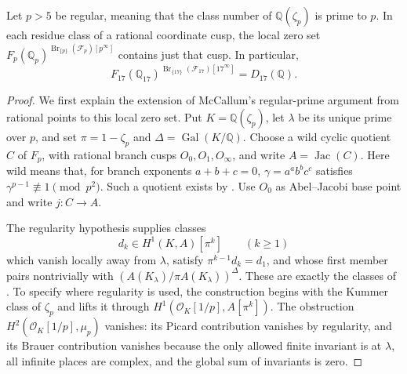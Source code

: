 \begin{proposition}
\label{prop:regular-primary-brauer-cusp-discs}
Let $p>5$ be regular, meaning that the class number of
$\mathbb Q(\zeta_p)$ is prime to $p$.  In each residue class of a
rational coordinate cusp, the local zero set
$F_p(\mathbb Q_p)^{\operatorname{Br}_{\{p\}}(\mathcal F_p)[p^\infty]}$
contains just that cusp.  In particular,
\[
 F_{17}(\mathbb Q_{17})^{\operatorname{Br}_{\{17\}}(\mathcal F_{17})[17^\infty]}
       =D_{17}(\mathbb Q).
\]
\end{proposition}
\begin{proof}
We first explain the extension of McCallum's regular-prime argument
from rational points to this local zero set.  Put
$K=\mathbb Q(\zeta_p)$, let $\lambda$ be its unique prime over $p$,
and set $\pi=1-\zeta_p$ and $\Delta=\operatorname{Gal}(K/\mathbb Q)$.
Choose a wild cyclic quotient $C$ of $F_p$, with rational branch
cusps $O_0,O_1,O_\infty$, and write $A=\operatorname{Jac}(C)$.
Here wild means that, for branch exponents $a+b+c=0$,
$\gamma=a^ab^bc^c$ satisfies $\gamma^{p-1}\not\equiv1\pmod {p^2}$.
Such a quotient exists by
\citet[Lemma~9, pp.~580--581]{McCallum1994}.
Use $O_0$ as Abel--Jacobi base point and write $j:C\to A$.

The regularity hypothesis supplies classes
\[
 d_k\in H^1(K,A)[\pi^k]\qquad(k\ge1)
\]
which vanish locally away from $\lambda$, satisfy
$\pi^{k-1}d_k=d_1$, and whose first member pairs nontrivially with
$(A(K_\lambda)/\pi A(K_\lambda))^\Delta$.
These are exactly the classes of
\citet[Lemma~10 and Theorem~5, pp.~581--582]{McCallum1994}.
To specify where regularity is used, the construction begins with
the Kummer class of $\zeta_p$ and lifts it through
$H^1(\mathcal O_K[1/p],A[\pi^k])$.
The obstruction $H^2(\mathcal O_K[1/p],\mu_p)$ vanishes: its
Picard contribution vanishes by regularity, and its Brauer
contribution vanishes because the only allowed finite invariant
is at $\lambda$, all infinite places are complex, and the global
sum of invariants is zero.


\end{proof}
